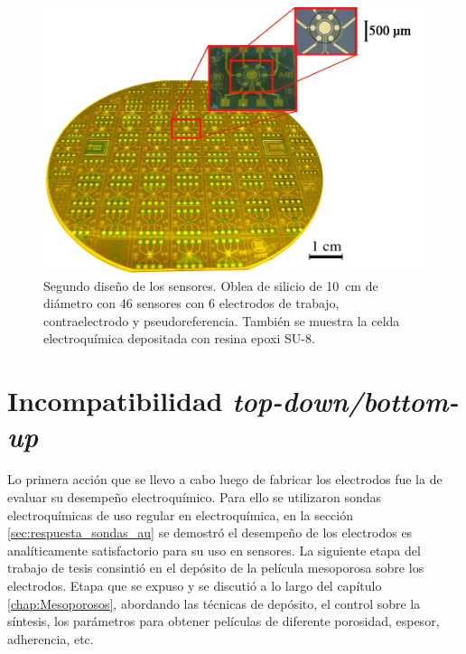 					  \begin{figure}[h!]
					  \begin{center}
					  \includegraphics[width=\textwidth]{Imagenes/ObleaV2.jpg}
					  \caption[Electrodos, segunda versión]{Segundo diseño de los sensores. Oblea de silicio de \SI{10}{cm} de diámetro con 46 sensores con 6 electrodos de trabajo, contraelectrodo y pseudoreferencia. También se muestra la celda electroquímica depositada con resina epoxi SU-8.}
					  \label{fig:ObleaV2}
					  \end{center}
					  \end{figure} 	
	
\section{Incompatibilidad \textit{top-down/bottom-up}}

  			Lo primera acción que se llevo a cabo luego de fabricar los electrodos fue la de evaluar su desempeño electroquímico. Para ello se utilizaron sondas electroquímicas de uso regular en electroquímica, en la sección \ref{sec:respuesta_sondas_au} se demostró el desempeño de los electrodos es analíticamente satisfactorio para su uso en sensores. La siguiente etapa del trabajo de tesis consintió en el depósito de la película mesoporosa sobre los electrodos. Etapa que se expuso y se discutió a lo largo del capítulo \ref{chap:Mesoporosos}, abordando las técnicas de depósito, el control sobre la síntesis, los parámetros para obtener películas de diferente porosidad, espesor, adherencia, etc.


